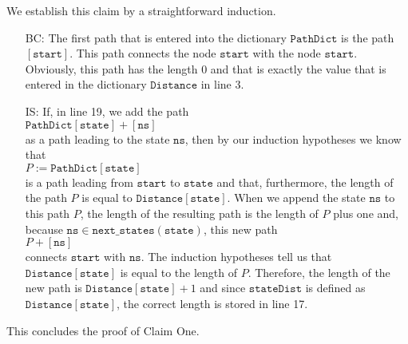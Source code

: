 \noindent
We establish this claim by a straightforward induction.  
\begin{enumerate}
\item[BC:] The first path that is entered into the dictionary $\texttt{PathDict}$ is the path
           $[\texttt{start}]$.  This path connects the node $\texttt{start}$ with the node $\texttt{start}$.
           Obviously, this path has the length $0$ and that is exactly the value that is entered in the
           dictionary $\texttt{Distance}$ in line 3.
\item[IS:] If, in line 19, we add the path
           \\[0.2cm]
           \hspace*{1.3cm}
           $\texttt{PathDict}[\texttt{state}] + [\texttt{ns}]$
           \\[0.2cm]
           as a path leading to the state $\texttt{ns}$, then by our induction hypotheses we know that
           \\[0.2cm]
           \hspace*{1.3cm}
           $P := \texttt{PathDict}[\texttt{state}]$ 
           \\[0.2cm]
           is a path leading from $\texttt{start}$ to $\texttt{state}$ and
           that, furthermore, the length of the path $P$ is equal to $\texttt{Distance}[\texttt{state}]$.  When
           we append the state $\texttt{ns}$ to this path $P$, the length of the resulting path is
           the length of $P$ plus one and, because $\mathtt{ns} \in \mathtt{next\_states}(\mathtt{state})$, this new path 
           \\[0.2cm]
           \hspace*{1.3cm}
           $P + [\texttt{ns}]$
           \\[0.2cm]
           connects $\texttt{start}$ with $\texttt{ns}$.  The induction hypotheses tell us that
           $\texttt{Distance}[\texttt{state}]$ is equal to the length of $P$.  Therefore, the length of the new
           path is $\texttt{Distance}[\texttt{state}] + 1$ and since $\texttt{stateDist}$ is defined as
           $\texttt{Distance}[\texttt{state}]$, the correct length is stored in line 17.
\end{enumerate}
This concludes the proof of Claim One. 
\vspace*{0.2cm}

